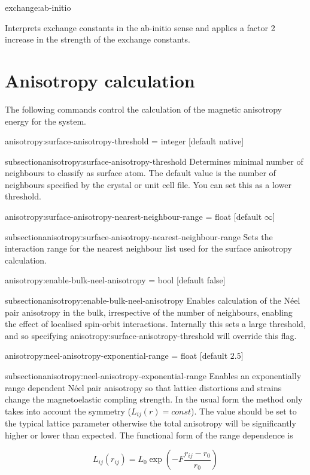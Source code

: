 {\zicf exchange:ab-initio}
Interprets exchange constants in the ab-initio sense and applies a factor 2 increase
in the strength of the exchange constants.\\

\section*{Anisotropy calculation}
 The following commands control the calculation of the magnetic anisotropy energy for the system.

{\zicf anisotropy:surface-anisotropy-threshold = integer [default native]}
{subsection}{anisotropy:surface-anisotropy-threshold} Determines minimal number of neighbours to classify as surface atom. The default value is the number of neighbours specified by the crystal or unit cell file. You can set this as a lower threshold.

{\zicf anisotropy:surface-anisotropy-nearest-neighbour-range = float [default $\infty$]}
{subsection}{anisotropy:surface-anisotropy-nearest-neighbour-range} Sets the interaction range for the nearest neighbour list used for the surface anisotropy calculation.

{\zicf anisotropy:enable-bulk-neel-anisotropy = bool [default false]}
{subsection}{anisotropy:enable-bulk-neel-anisotropy} Enables calculation of the N\'eel pair anisotropy in the bulk, irrespective of the number of neighbours, enabling the effect of localised spin-orbit interactions. Internally this sets a large threshold, and so specifying anisotropy:surface-anisotropy-threshold will override this flag.

{\zicf anisotropy:neel-anisotropy-exponential-range = float [default $2.5$]}
{subsection}{anisotropy:neel-anisotropy-exponential-range} Enables an exponentially range dependent N\'eel pair anisotropy so that lattice distortions and strains change the magnetoelastic compling strength. In the usual form the method only takes into account the symmetry ($L_{ij}(r) = const$). The value should be set to the typical lattice parameter otherwise the total anisotropy will be significantly higher or lower than expected. The functional form of the range dependence is

\begin{equation}
   L_{ij}(r_{ij}) = L_0 \exp\left(-F\frac{r_{ij} - r_0}{r_{0}}\right)
\end{equation}

